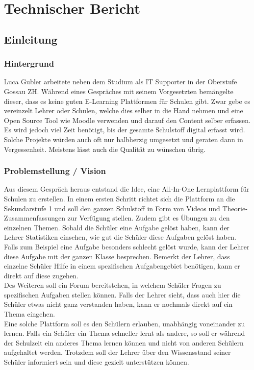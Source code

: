 \section{Technischer Bericht}
\subsection{Einleitung}

\subsubsection{Hintergrund}
Luca Gubler arbeitete neben dem Studium als IT Supporter in der Oberstufe Gossau ZH. Während eines Gespräches mit seinem Vorgesetzten bemängelte dieser, dass es keine guten E-Learning Plattformen für Schulen gibt. Zwar gebe es vereinzelt Lehrer oder Schulen, welche dies selber in die Hand nehmen und eine Open Source Tool wie Moodle verwenden und darauf den Content selber erfassen. Es wird jedoch viel Zeit benötigt, bis der gesamte Schulstoff digital erfasst wird. Solche Projekte würden auch oft nur halbherzig umgesetzt und geraten dann in Vergessenheit. Meistens lässt auch die Qualität zu wünschen übrig.

\subsubsection{Problemstellung / Vision}
Aus diesem Gespräch heraus entstand die Idee, eine All-In-One Lernplattform für Schulen zu erstellen. In einem ersten Schritt richtet sich die Plattform an die Sekundarstufe 1 und soll den ganzen Schulstoff in Form von Videos und Theorie-Zusammenfassungen zur Verfügung stellen. Zudem gibt es Übungen zu den einzelnen Themen. Sobald die Schüler eine Aufgabe gelöst haben, kann der Lehrer Statistiken einsehen, wie gut die Schüler diese Aufgaben gelöst haben. Falls zum Beispiel eine Aufgabe besonders schlecht gelöst wurde, kann der Lehrer diese Aufgabe mit der ganzen Klasse besprechen. Bemerkt der Lehrer, dass einzelne Schüler Hilfe in einem spezifischen Aufgabengebiet benötigen, kann er direkt auf diese zugehen.\\

Des Weiteren soll ein Forum bereitstehen, in welchem Schüler Fragen zu spezifischen Aufgaben stellen können. Falls der Lehrer sieht, dass auch hier die Schüler etwas nicht ganz verstanden haben, kann er nochmals direkt auf ein Thema eingehen. \\

Eine solche Plattform soll es den Schülern erlauben, unabhängig voneinander zu lernen. Falls ein Schüler ein Thema schneller lernt als andere, so soll er während der Schulzeit ein anderes Thema lernen können und nicht von anderen Schülern aufgehaltet werden. Trotzdem soll der Lehrer über den Wissensstand seiner Schüler informiert sein und diese gezielt unterstützen können.

